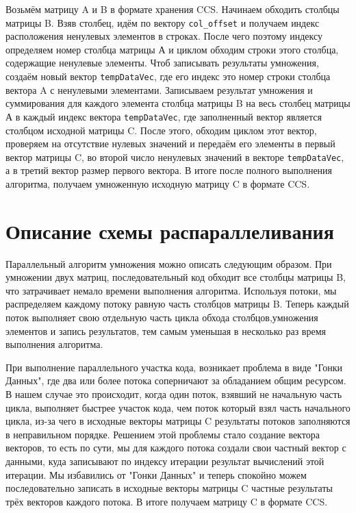 \documentclass[14pt,a4paper,report]{ncc}
\begin{document}
	
	Возьмём матрицу A и B в формате хранения CCS. Начинаем обходить столбцы матрицы B. Взяв столбец, идём по вектору \verb|col_offset| и получаем индекс расположения ненулевых элементов в строках. После чего поэтому индексу определяем номер столбца матрицы А и циклом обходим строки этого столбца, содержащие ненулевые элементы. Чтоб записывать результаты умножения, создаём новый вектор \verb|tempDataVec|, где его индекс это номер строки столбца вектора A с ненулевыми элементами. Записываем результат умножения и суммирования для каждого элемента столбца матрицы B на весь столбец матрицы А в каждый индекс вектора \verb|tempDataVec|, где заполненный вектор является столбцом исходной матрицы C. После этого, обходим циклом этот вектор, проверяем на отсутствие нулевых значений и передаём его элементы в первый вектор матрицы C, во второй число ненулевых значений в векторе \verb|tempDataVec|, а в третий вектор размер первого вектора. В итоге после полного выполнения алгоритма, получаем умноженную исходную матрицу C в формате CCS.
	\newpage
	
	\section*{Описание схемы распараллеливания}
	Параллельный алгоритм умножения можно описать следующим образом. При умножении двух матриц, последовательный код обходит все столбцы матрицы B, что затрачивает немало времени выполнения алгоритма. Используя потоки, мы распределяем каждому потоку равную часть столбцов матрицы B. Теперь каждый поток выполняет свою отдельную часть цикла обхода столбцов,умножения элементов и запись результатов, тем самым уменьшая в несколько раз время выполнения алгоритма. 
	\par При выполнение параллельного участка кода, возникает проблема в виде "Гонки Данных"{}, где два или более потока соперничают за обладанием общим ресурсом. В нашем случае это происходит, когда один поток, взявший не начальную часть цикла, выполняет быстрее участок кода, чем поток который взял часть начального цикла, из-за чего в исходные векторы матрицы C результаты потоков заполняются в неправильном порядке. Решением этой проблемы стало создание вектора векторов, то есть по сути, мы для каждого потока создали свои частный вектор с данными, куда записывают по индексу итерации результат вычислений этой итерации. Мы избавились от "Гонки Данных" и теперь спокойно можем последовательно записать в исходные векторы матрицы C частные результаты трёх векторов каждого потока. В итоге получаем матрицу C в формате CCS.
	\newpage
	
\end{document}
